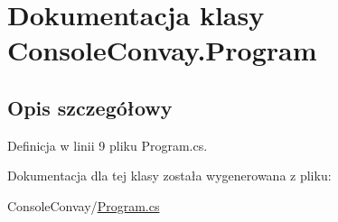 \hypertarget{class_console_convay_1_1_program}{}\section{Dokumentacja klasy Console\+Convay.\+Program}
\label{class_console_convay_1_1_program}


\subsection{Opis szczegółowy}


Definicja w linii 9 pliku Program.\+cs.



Dokumentacja dla tej klasy została wygenerowana z pliku\+:\begin{DoxyCompactItemize}
\item 
Console\+Convay/\hyperlink{_console_convay_2_program_8cs}{Program.\+cs}\end{DoxyCompactItemize}
